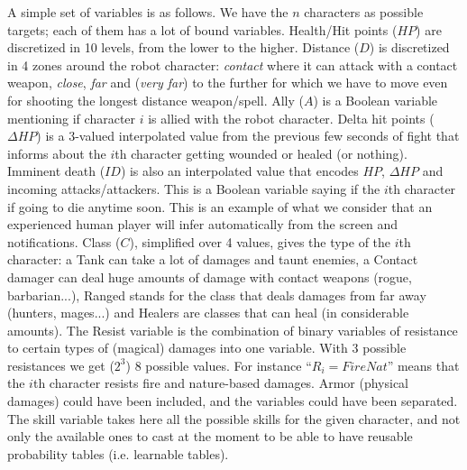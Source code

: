 A simple set of variables is as follows. We have the $n$ characters as possible targets; each of them has a lot of bound variables. Health/Hit points ($HP$) are discretized in 10 levels, from the lower to the higher. Distance ($D$) is discretized in 4 zones around the robot character: \textit{contact} where it can attack with a contact weapon, \textit{close}, \textit{far} and (\textit{very far}) to the further for which we have to move even for shooting the longest distance weapon/spell. Ally ($A$) is a Boolean variable mentioning if character $i$ is allied with the robot character. Delta hit points ($\Delta HP$) is a 3-valued interpolated value from the previous few seconds of fight that informs about the $i$th character getting wounded or healed (or nothing). Imminent death ($ID$) is also an interpolated value that encodes $HP$, $\Delta HP$ and incoming attacks/attackers. This is a Boolean variable saying if the $i$th character if going to die anytime soon. This is an example of what we consider that an experienced human player will infer automatically from the screen and notifications. Class ($C$), simplified over 4 values, gives the type of the $i$th character: a Tank can take a lot of damages and taunt enemies, a Contact damager can deal huge amounts of damage with contact weapons (rogue, barbarian...), Ranged stands for the class that deals damages from far away (hunters, mages...) and Healers are classes that can heal (in considerable amounts). The Resist variable is the combination of binary variables of resistance to certain types of (magical) damages into one variable. With 3 possible resistances we get ($2^3$) 8 possible values. For instance ``$R_i=FireNat$'' means that the $i$th character resists fire and nature-based damages. Armor (physical damages) could have been included, and the variables could have been separated. The skill variable takes here all the possible skills for the given character, and not only the available ones to cast at the moment to be able to have reusable probability tables (i.e. learnable tables).

